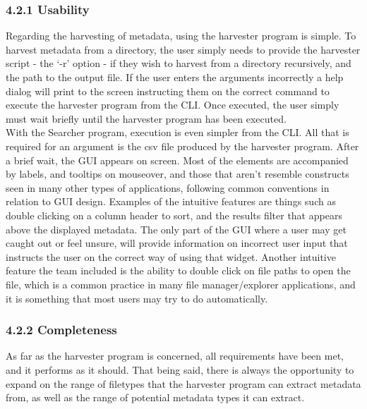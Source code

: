 \documentclass[11pt]{article}
\begin{document}
\begin{adjustwidth}{1cm}{}

\subsubsection{4.2.1 Usability}
Regarding the harvesting of metadata, using the harvester program is simple. To harvest metadata from a directory, the user simply needs to provide the harvester script - the ‘-r’ option - if they wish to harvest from a directory recursively, and the path to the output file. If the user enters the arguments incorrectly a help dialog will print to the screen instructing them on the correct command to execute the harvester program from the CLI. Once executed, the user simply must wait briefly until the harvester program has been executed. \\

With the Searcher program, execution is even simpler from the CLI. All that is required for an argument is the csv file produced by the harvester program. After a brief wait, the GUI appears on screen. Most of the elements are accompanied by labels, and tooltips on mouseover, and those that aren’t resemble constructs seen in many other types of applications, following common conventions in relation to GUI design. Examples of the intuitive features are things such as double clicking on a column header to sort, and the results filter that appears above the displayed metadata. The only part of the GUI where a user may get caught out or feel unsure, will provide information on incorrect user input that instructs the user on the correct way of using that widget. Another intuitive feature the team included is the ability to double click on file paths to open the file, which is a common practice in many file manager/explorer applications, and it is something that most users may try to do automatically. \\

\subsubsection{4.2.2 Completeness}
As far as the harvester program is concerned, all requirements have been met, and it performs as it should. That being said, there is always the opportunity to expand on the range of filetypes that the harvester program can extract metadata from, as well as the range of potential metadata types it can extract. \\


\end{adjustwidth}
\end{document}
